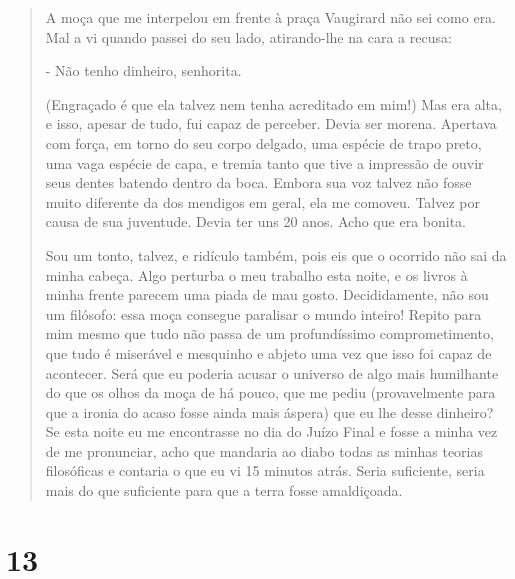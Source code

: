 \begin{quote}
A moça que me interpelou em frente à praça Vaugirard não sei como era.
Mal a vi quando passei do seu lado, atirando-lhe na cara a recusa:

- Não tenho dinheiro, senhorita.

(Engraçado é que ela talvez nem tenha acreditado em mim!) Mas era alta,
e isso, apesar de tudo, fui capaz de perceber. Devia ser morena.
Apertava com força, em torno do seu corpo delgado, uma espécie de trapo
preto, uma vaga espécie de capa, e tremia tanto que tive a impressão de
ouvir seus dentes batendo dentro da boca. Embora sua voz talvez não
fosse muito diferente da dos mendigos em geral, ela me comoveu. Talvez
por causa de sua juventude. Devia ter uns 20 anos. Acho que era bonita.

Sou um tonto, talvez, e ridículo também, pois eis que o ocorrido não sai
da minha cabeça. Algo perturba o meu trabalho esta noite, e os livros à
minha frente parecem uma piada de mau gosto. Decididamente, não sou um
filósofo: essa moça consegue paralisar o mundo inteiro! Repito para mim
mesmo que tudo não passa de um profundíssimo comprometimento, que tudo é
miserável e mesquinho e abjeto uma vez que isso foi capaz de acontecer.
Será que eu poderia acusar o universo de algo mais humilhante do que os
olhos da moça de há pouco, que me pediu (provavelmente para que a ironia
do acaso fosse ainda mais áspera) que eu lhe desse dinheiro? Se esta
noite eu me encontrasse no dia do Juízo Final e fosse a minha vez de me
pronunciar, acho que mandaria ao diabo todas as minhas teorias
filosóficas e contaria o que eu vi 15 minutos atrás. Seria suficiente,
seria mais do que suficiente para que a terra fosse amaldiçoada.
\end{quote}

\section{13}\label{section-12}

